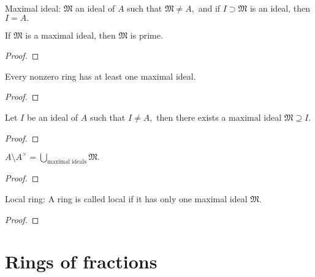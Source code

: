 Maximal ideal: $\mathfrak{M}$ an ideal of $A$ such that
$\mathfrak{M}\neq A,$ and if $I\supset \mathfrak{M}$ is an ideal,
then $I=A.$
\begin{cor}
If $\mathfrak{M}$ is a maximal ideal, then $\mathfrak{M}$ is prime.
\end{cor}
\begin{proof}

\end{proof}
\begin{thm}
Every nonzero ring has at least one maximal ideal.
\end{thm}
\begin{proof}

\end{proof}
\begin{cor}
Let $I$ be an ideal of $A$ such that $I\neq A,$ then there exists a
maximal ideal $\mathfrak{M}\supseteq I.$
\end{cor}
\begin{proof}

\end{proof}
\begin{cor}
$A\setminus A^{\times} = \bigcup\limits_{\text{maximal
ideals}}\mathfrak{M}.$
\end{cor}
\begin{proof}

\end{proof}
Local ring: A ring is called local if it has only one maximal ideal
$\mathfrak{M}.$
\begin{proof}

\end{proof}

\newpage

\section{Rings of fractions}

